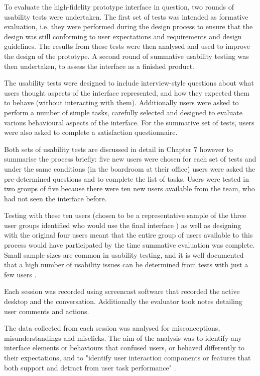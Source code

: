 To evaluate the high-fidelity prototype interface in question, two rounds of usability tests were undertaken. The first set of tests was intended as formative evaluation, i.e. they were performed during the design process to ensure that the design was still conforming to user expectations and requirements \citep[p. 437]{RogersPreece} and design guidelines. The results from these tests were then analysed and used to improve the design of the prototype. A second round of summative usability testing was then undertaken, to assess the interface as a finished product. 

The usability tests were designed to include interview-style questions about what users thought aspects of the interface represented, and how they expected them to behave (without interacting with them). Additionally users were asked to perform a number of simple tasks, carefully selected and designed to evaluate various behavioural aspects of the interface. For the summative set of tests, users were also asked to complete a satisfaction questionnaire. 

Both sets of usability tests are discussed in detail in Chapter 7 however to summarise the process briefly: five new users were chosen for each set of tests and under the same conditions (in the boardroom at their office) users were asked the pre-determined questions and to complete the list of tasks. Users were tested in two groups of five because there were ten new users available from the team, who had not seen the interface before. 

Testing with these ten users (chosen to be a representative sample of the three user groups identified who would use the final interface \citep[p. 461]{RogersPreece}) as well as designing with the original four users meant that the entire group of users available to this process would have participated by the time summative evaluation was complete. Small sample sizes are common in usability testing, and it is well documented that a high number of usability issues can be determined from tests with just a few users \citep[p. 119]{HackosRedish}.

Each session was recorded using screencast software \citep{Kazam} that recorded the active desktop and the conversation. Additionally the evaluator took notes detailing user comments and actions. 

The data collected from each session was analysed for misconceptions, misunderstandings and misclicks. The aim of the analysis was to identify any interface elements or behaviours that confused users, or behaved differently to their expectations, and to "identify user interaction components or features that both support and detract from user task performance" \citep{GabbardHix}.

